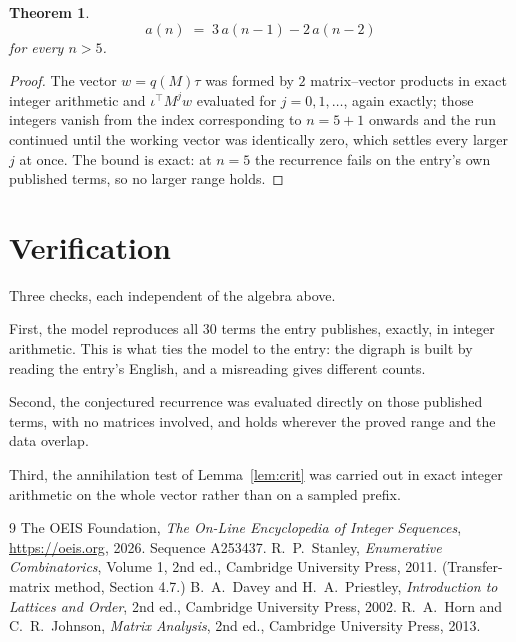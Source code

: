 \documentclass[11pt,a4paper]{article}
\theoremstyle{plain}
\newtheorem{theorem}{Theorem}
\theoremstyle{definition}
\begin{document}
\begin{theorem}
\[
a(n)\;=\;3\,a(n-1) - 2\,a(n-2)
\]
for every $n>5$.
\end{theorem}

\begin{proof}
The vector $w=q(M)\tau$ was formed by $2$ matrix--vector products in exact integer
arithmetic and $\iota^{\!\top}M^{j}w$ evaluated for $j=0,1,\dots$, again exactly; those
integers vanish from the index corresponding to $n=5+1$ onwards and the run continued
until the working vector was identically zero, which settles every larger $j$ at once. The bound is exact: at $n=5$ the recurrence fails on the entry's own published terms, so no larger range holds.
\end{proof}

\section{Verification}

Three checks, each independent of the algebra above.

First, the model reproduces all $30$ terms the entry publishes, exactly, in integer
arithmetic. This is what ties the model to the entry: the digraph is built by reading the
entry's English, and a misreading gives different counts.

Second, the conjectured recurrence was evaluated directly on those published terms, with no
matrices involved, and holds wherever the proved range and the data overlap.

Third, the annihilation test of Lemma~\ref{lem:crit} was carried out in exact integer
arithmetic on the whole vector rather than on a sampled prefix.

\begin{thebibliography}{9}
 The OEIS Foundation, \emph{The On-Line Encyclopedia of Integer
Sequences}, \url{https://oeis.org}, 2026. Sequence A253437.
 R.~P.~Stanley, \emph{Enumerative Combinatorics}, Volume 1, 2nd ed.,
Cambridge University Press, 2011. (Transfer-matrix method, Section 4.7.)
 B.~A.~Davey and H.~A.~Priestley, \emph{Introduction to Lattices and
Order}, 2nd ed., Cambridge University Press, 2002.
 R.~A.~Horn and C.~R.~Johnson, \emph{Matrix Analysis}, 2nd ed., Cambridge
University Press, 2013.
\end{thebibliography}
\end{document}
